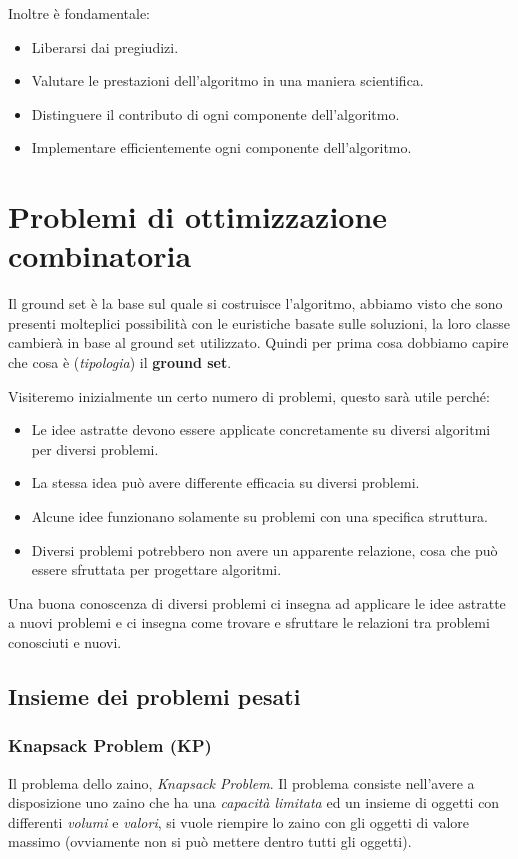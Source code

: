 \documentclass{article}
\begin{document}
Inoltre è fondamentale:
\begin{itemize}
    \item Liberarsi dai pregiudizi.
    \item Valutare le prestazioni dell'algoritmo in una maniera scientifica.
    \item Distinguere il contributo di ogni componente dell'algoritmo.
    \item Implementare efficientemente ogni componente dell'algoritmo.
\end{itemize}

\section{Problemi di ottimizzazione combinatoria}
Il ground set è la base sul quale si costruisce l'algoritmo, abbiamo visto che sono presenti molteplici possibilità con le
euristiche basate sulle soluzioni, la loro classe cambierà in base al ground set utilizzato.
Quindi per prima cosa dobbiamo capire che cosa è (\textit{tipologia}) il \textbf{ground set}.

Visiteremo inizialmente un certo numero di problemi, questo sarà utile perché:
\begin{itemize}
    \item Le idee astratte devono essere applicate concretamente su diversi algoritmi per diversi problemi.
    \item La stessa idea può avere differente efficacia su diversi problemi.
    \item Alcune idee funzionano solamente su problemi con una specifica struttura.
    \item Diversi problemi potrebbero non avere un apparente relazione, cosa che può essere sfruttata per progettare algoritmi.
\end{itemize}

Una buona conoscenza di diversi problemi ci insegna ad applicare le idee astratte a nuovi problemi e ci insegna come trovare e sfruttare le relazioni tra problemi conosciuti e nuovi.

\subsection{Insieme dei problemi pesati}
\subsubsection{Knapsack Problem (KP)}
Il problema dello zaino, \textit{Knapsack Problem}. Il problema consiste nell'avere a disposizione uno zaino che ha una \textit{capacità limitata} ed un insieme di oggetti con differenti
\textit{volumi} e \textit{valori}, si vuole riempire lo zaino con gli oggetti di valore massimo (ovviamente non si può mettere dentro tutti gli oggetti).
\end{document}
